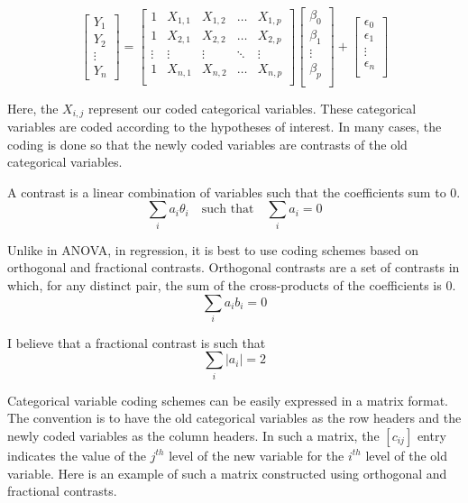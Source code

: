 \documentclass[
]{book}
\begin{document}
\[
\begin{bmatrix}
Y_1\\
Y_2\\
\vdots\\
Y_n
\end{bmatrix}
= 
\begin{bmatrix}
1 & X_{1,1} & X_{1,2} & \dots & X_{1, p}\\
1 & X_{2,1} & X_{2,2} & \dots & X_{2, p}\\
\vdots & \vdots & \vdots & \ddots & \vdots\\
1 & X_{n,1} & X_{n,2} & \dots & X_{n, p}\\
\end{bmatrix}
\begin{bmatrix}
\beta_0\\
\beta_1\\
\vdots\\
\beta_p\\
\end{bmatrix}
+
\begin{bmatrix}
\epsilon_0\\
\epsilon_1\\
\vdots\\
\epsilon_n\\
\end{bmatrix}
\]

Here, the \(X_{i,j}\) represent our coded categorical variables. These
categorical variables are coded according to the hypotheses of interest.
In many cases, the coding is done so that the newly coded variables are
contrasts of the old categorical variables.

A contrast is a linear combination of variables such that the
coefficients sum to 0.
\[\sum_i{a_i\theta_i}\quad\text{such that}\quad\sum_i{a_i}=0\]

Unlike in ANOVA, in regression, it is best to use coding schemes based
on orthogonal and fractional contrasts. Orthogonal contrasts are a set
of contrasts in which, for any distinct pair, the sum of the
cross-products of the coefficients is 0.
\[
\sum_i{a_ib_i}=0
\]

I believe that a fractional contrast is such that
\[
\sum_i{|a_i|}=2
\]

Categorical variable coding schemes can be easily expressed in a matrix
format. The convention is to have the old categorical variables as the
row headers and the newly coded variables as the column headers. In such
a matrix, the \([c_{ij}]\) entry indicates the value of the \(j^{th}\) level
of the new variable for the \(i^{th}\) level of the old variable. Here is
an example of such a matrix constructed using orthogonal and fractional
contrasts.
\end{document}
